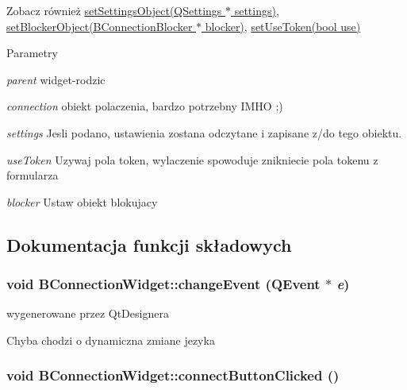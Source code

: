 \begin{DoxySeeAlso}{Zobacz również}
\hyperlink{class_b_connection_widget_a45070066f5da8af537f422d8b37c7d6e}{setSettingsObject(QSettings $\ast$ settings)}, \hyperlink{class_b_connection_widget_a976657d9910495a76d16b7c90d0b54fc}{setBlockerObject(BConnectionBlocker $\ast$ blocker)}, \hyperlink{class_b_connection_widget_a80d71ca868172dc623b9fa6c1ab938a6}{setUseToken(bool use)} 
\end{DoxySeeAlso}

\begin{DoxyParams}{Parametry}
\item[{\em parent}]widget-\/rodzic \item[{\em connection}]obiekt polaczenia, bardzo potrzebny IMHO ;) \item[{\em settings}]Jesli podano, ustawienia zostana odczytane i zapisane z/do tego obiektu. \item[{\em useToken}]Uzywaj pola token, wylaczenie spowoduje znikniecie pola tokenu z formularza \item[{\em blocker}]Ustaw obiekt blokujacy \end{DoxyParams}


\subsection{Dokumentacja funkcji składowych}
\hypertarget{class_b_connection_widget_a7396f6332ea7735a6a330fc11927d183}{
\subsubsection[{changeEvent}]{\setlength{\rightskip}{0pt plus 5cm}void BConnectionWidget::changeEvent (QEvent $\ast$ {\em e})}}
\label{class_b_connection_widget_a7396f6332ea7735a6a330fc11927d183}


wygenerowane przez QtDesignera 

Chyba chodzi o dynamiczna zmiane jezyka \hypertarget{class_b_connection_widget_a2eef5117ae0e5b76ca02a86d00fbd70a}{
\subsubsection[{connectButtonClicked}]{\setlength{\rightskip}{0pt plus 5cm}void BConnectionWidget::connectButtonClicked ()}}
\label{class_b_connection_widget_a2eef5117ae0e5b76ca02a86d00fbd70a}


